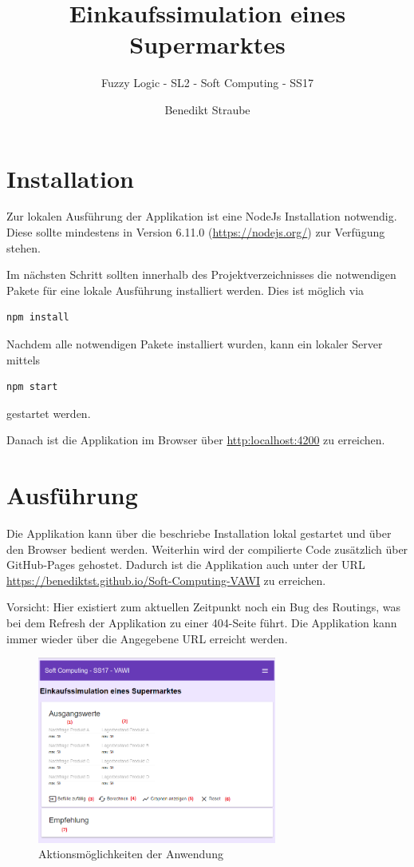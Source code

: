 \documentclass[]{scrartcl}
\title{Einkaufssimulation eines Supermarktes}
\subtitle{Fuzzy Logic - SL2 - Soft Computing - SS17}
\author{Benedikt Straube}
\begin{document}
\maketitle

\newpage

\section{Installation}
Zur lokalen Ausführung der Applikation ist eine NodeJs Installation notwendig. Diese sollte mindestens in Version 6.11.0 (\url{https://nodejs.org/}) zur Verfügung stehen.

Im nächsten Schritt sollten innerhalb des Projektverzeichnisses die notwendigen Pakete für eine lokale Ausführung installiert werden. Dies ist möglich via 
\begin{lstlisting}[backgroundcolor=\color{lightgray}]
npm install
\end{lstlisting}

Nachdem alle notwendigen Pakete installiert wurden, kann ein lokaler Server mittels
\begin{lstlisting}[backgroundcolor=\color{lightgray}]
npm start
\end{lstlisting}
gestartet werden.

Danach ist die Applikation im Browser über \url{http:localhost:4200} zu erreichen.


\section{Ausführung}
\label{ausfuehrung}
Die Applikation kann über die beschriebe Installation lokal gestartet und über den Browser bedient werden. Weiterhin wird der compilierte Code zusätzlich über GitHub-Pages gehostet. Dadurch ist die Applikation auch unter der URL \url{https://benediktst.github.io/Soft-Computing-VAWI} zu erreichen.

Vorsicht: Hier existiert zum aktuellen Zeitpunkt noch ein Bug des Routings, was bei dem Refresh der Applikation zu einer 404-Seite führt. Die Applikation kann immer wieder über die Angegebene URL erreicht werden.

\begin{figure}[htbp]
	\centering
	\includegraphics[width=0.7\textwidth]{res/screenshot1.png}
	\caption{Aktionsmöglichkeiten der Anwendung}
	\label{img:interface}
\end{figure}
\end{document}
